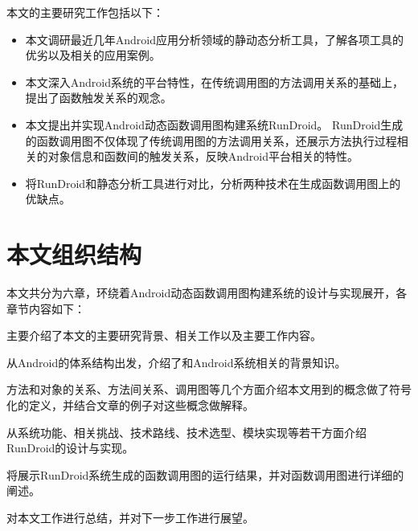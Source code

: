 
本文的主要研究工作包括以下：
\begin{itemize}
	\setlength{\itemsep}{1pt}
	\setlength{\parskip}{0pt}
	\setlength{\parsep}{0pt}
	\item 本文调研最近几年Android应用分析领域的静动态分析工具，了解各项工具的优劣以及相关的应用案例。
	\item 本文深入Android系统的平台特性，在传统调用图的方法调用关系的基础上，提出了函数触发关系的观念。
	\item 本文提出并实现Android动态函数调用图构建系统RunDroid。
	RunDroid生成的函数调用图不仅体现了传统调用图的方法调用关系，还展示方法执行过程相关的对象信息和函数间的触发关系，反映Android平台相关的特性。
	\item 
	
	将RunDroid和静态分析工具进行对比，分析两种技术在生成函数调用图上的优缺点。
\end{itemize}


\section{本文组织结构}

本文共分为六章，环绕着Android动态函数调用图构建系统的设计与实现展开，各章节内容如下：

\textbf{}主要介绍了本文的主要研究背景、相关工作以及主要工作内容。


\textbf{}从Android的体系结构出发，介绍了和Android系统相关的背景知识。


\textbf{}方法和对象的关系、方法间关系、调用图等几个方面介绍本文用到的概念做了符号化的定义，并结合文章的例子对这些概念做解释。

\textbf{}从系统功能、相关挑战、技术路线、技术选型、模块实现等若干方面介绍RunDroid的设计与实现。

\textbf{}


\textbf{}将展示RunDroid系统生成的函数调用图的运行结果，并对函数调用图进行详细的阐述。


\textbf{}对本文工作进行总结，并对下一步工作进行展望。


